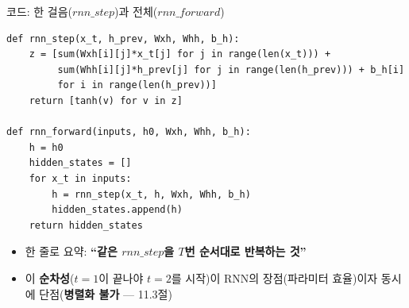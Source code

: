 \documentclass[aspectratio=169,11pt]{beamer}
\begin{document}
\begin{frame}[fragile]{코드: 한 걸음($rnn\_step$)과 전체($rnn\_forward$)}
\begin{lstlisting}
def rnn_step(x_t, h_prev, Wxh, Whh, b_h):
    z = [sum(Wxh[i][j]*x_t[j] for j in range(len(x_t))) +
         sum(Whh[i][j]*h_prev[j] for j in range(len(h_prev))) + b_h[i]
         for i in range(len(h_prev))]
    return [tanh(v) for v in z]

def rnn_forward(inputs, h0, Wxh, Whh, b_h):
    h = h0
    hidden_states = []
    for x_t in inputs:
        h = rnn_step(x_t, h, Wxh, Whh, b_h)
        hidden_states.append(h)
    return hidden_states
\end{lstlisting}
  \begin{itemize}
    \item 한 줄로 요약: \textbf{``같은 $rnn\_step$을 $T$번 순서대로
      반복하는 것''}
    \item 이 \textbf{순차성}($t=1$이 끝나야 $t=2$를 시작)이 RNN의
      장점(파라미터 효율)이자 동시에 단점(\textbf{병렬화 불가} ---
      11.3절)
  \end{itemize}
\end{frame}

\end{document}
